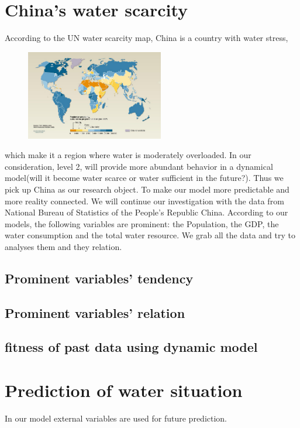 \section{China's water scarcity}
  According to the UN water scarcity map\cite{WaterScarcityMap}, China is a country with water stress,
  \begin{figure}
  \includegraphics[width = 6cm]{picture/WaterScarcityMap.jpg}
  \end{figure}
  which make it a region where water is moderately overloaded. In our consideration, level 2, will provide more abundant behavior in a dynamical model(will it become water scarce or water sufficient in the future?). Thus we pick up China as our research object. To make our model more predictable and more reality connected. We will continue our investigation with the data from National Bureau of Statistics of the People's Republic China\cite{ChinaDataBase}.
  According to our models, the following variables are prominent: the Population, the GDP, the water consumption and the total water resource.
  We grab all the data and try to analyses them and they relation.

  \subsection{Prominent variables' tendency}

  \subsection{Prominent variables' relation}

  \subsection{fitness of past data using dynamic model}


\section{Prediction of water situation}
  In our model external variables are used for future prediction.


